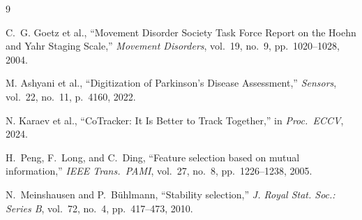 \documentclass[12pt, a4paper]{article}
\begin{document}
\begin{thebibliography}{9}

C.~G. Goetz et al., ``Movement Disorder Society Task Force Report on the Hoehn and Yahr
Staging Scale,'' \textit{Movement Disorders}, vol.~19, no.~9, pp.~1020--1028, 2004.

M. Ashyani et al., ``Digitization of Parkinson's Disease Assessment,''
\textit{Sensors}, vol.~22, no.~11, p.~4160, 2022.

N. Karaev et al., ``CoTracker: It Is Better to Track Together,''
in \textit{Proc.\ ECCV}, 2024.

H.~Peng, F.~Long, and C.~Ding, ``Feature selection based on mutual information,''
\textit{IEEE Trans.\ PAMI}, vol.~27, no.~8, pp.~1226--1238, 2005.

N.~Meinshausen and P.~B\"{u}hlmann, ``Stability selection,''
\textit{J. Royal Stat. Soc.: Series B}, vol.~72, no.~4, pp.~417--473, 2010.

\end{thebibliography}
\end{document}
